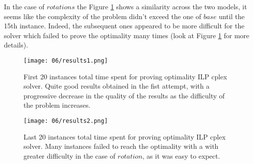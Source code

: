     In the case of \(rotations\) the Figure \ref{fig:ILP_results1} shows a similarity across the
    two models, it seems like the complexity of the problem didn't exceed the one of \(base\)
    until the 15th instance. Indeed, the subsequent ones appeared to be more difficult for the
    solver which failed to prove the optimality many times (look at Figure \ref{fig:ILP_results1} 
    for more details). \\ 

    \begin{figure}[H]
      \centering
      \texttt{[image: 06/results1.png]}
      \caption{
        First 20 instances total time spent for proving optimality ILP cplex solver. Quite good 
        results obtained in the fist attempt, with a progressive decrease in the quality of the 
        results as the difficulty of the problem increases.
      }
      \label{fig:ILP_results1}
    \end{figure}
    \begin{figure}[H]
      \centering
      \texttt{[image: 06/results2.png]}
      \caption{
        Last 20 instances total time spent for proving optimality ILP cplex solver. Many 
        instances failed to reach the optimality with a with greater difficulty in the case of 
        \(rotation\), as it was easy to expect.
      }
      \label{fig:ILP_results2}
    \end{figure}

